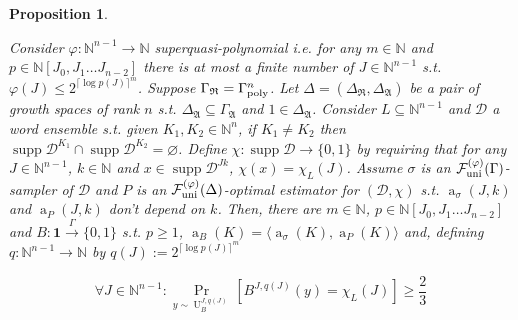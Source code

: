 \documentclass{article}
\numberwithin{equation}{section}
\theoremstyle{definition}
\theoremstyle{plain}
\newtheorem{proposition}{Proposition}[section]
\newcommand{\Bool}{\{0,1\}}
\DeclareMathOperator{\Supp}{supp}
\DeclareMathOperator{\Prb}{Pr}
\DeclareMathOperator{\A}{a}
\DeclareMathOperator{\Un}{U}
\newcommand{\Nats}{\mathbb{N}}
\newcommand{\NatPolyJ}{\Nats[J_0, J_1 \ldots J_{n-2}]}
\newcommand{\Ceil}[1]{\lceil #1 \rceil}
\newcommand{\Chev}[1]{\langle #1 \rangle}
\newcommand{\Dist}{\mathcal{D}}
\newcommand{\GrowR}{\Gamma_{\mathfrak{R}}}
\newcommand{\GrowA}{\Gamma_{\mathfrak{A}}}
\newcommand{\Fall}{\mathcal{F}}
\newcommand{\GammaPoly}{\Gamma_{\textnormal{poly}}}
\newcommand{\FallUt}[1]{{\Fall_{\textnormal{uni}}^{(#1)}}}
\newcommand{\Scheme}{\xrightarrow{\Gamma}}
\begin{document}
\begin{samepage}
\begin{proposition}
\label{prp:tally_fall_uni}

Consider ${\varphi: \Nats^{n-1} \rightarrow \Nats}$ superquasi-polynomial i.e. for any ${m \in \Nats}$ and\\ ${p \in \NatPolyJ}$ there is at most a finite number of ${J \in \Nats^{n-1}}$ s.t. ${\varphi(J) \leq 2^{\Ceil{\log p(J)}^m}}$. Suppose ${\GrowR  = \GammaPoly^n}$. Let ${\Delta=(\Delta_{\mathfrak{R}}, \Delta_{\mathfrak{A}})}$ be a pair of growth spaces of rank ${n}$ s.t. ${\Delta_{\mathfrak{A}} \subseteq \GrowA}$ and ${1 \in \Delta_{\mathfrak{A}}}$. Consider ${L \subseteq \Nats^{n-1}}$ and ${\Dist}$ a word ensemble s.t. given ${K_1, K_2 \in \Nats^n}$, if ${K_1 \ne K_2}$ then ${\Supp \Dist^{K_1} \cap \Supp \Dist^{K_2} = \varnothing}$. Define ${\chi: \Supp \Dist \rightarrow \Bool}$ by requiring that for any ${J \in \Nats^{n-1}}$, ${k \in \Nats}$ and ${x \in \Supp \Dist^{Jk}}$, ${\chi(x)=\chi_L(J)}$. Assume ${\sigma}$ is an ${\FallUt{\varphi}(\Gamma)}$-sampler of ${\Dist}$ and ${P}$ is an ${\FallUt{\varphi}(\Delta)}$-optimal estimator for ${(\Dist, \chi)}$ s.t. ${\A_\sigma(J,k)}$ and ${\A_P(J,k)}$ don't depend on ${k}$. Then, there are $m \in \Nats$, ${p \in \NatPolyJ}$ and ${B: \bm{1} \Scheme \Bool}$ s.t. ${p \geq 1}$, ${\A_B(K)=\Chev{\A_\sigma(K),\A_P(K)}}$ and, defining ${q: \Nats^{n-1} \rightarrow \Nats}$ by ${q(J):=2^{\Ceil{\log p(J)}^m}}$

\begin{equation}
\label{eqn:prp__tally_fall_uni}
\forall J \in \Nats^{n-1}:\Prb_{y \sim \Un_B^{J,q(J)}}[B^{J,q(J)}(y)=\chi_L(J)] \geq \frac{2}{3}
\end{equation}

\end{proposition}
\end{samepage}
\end{document}
